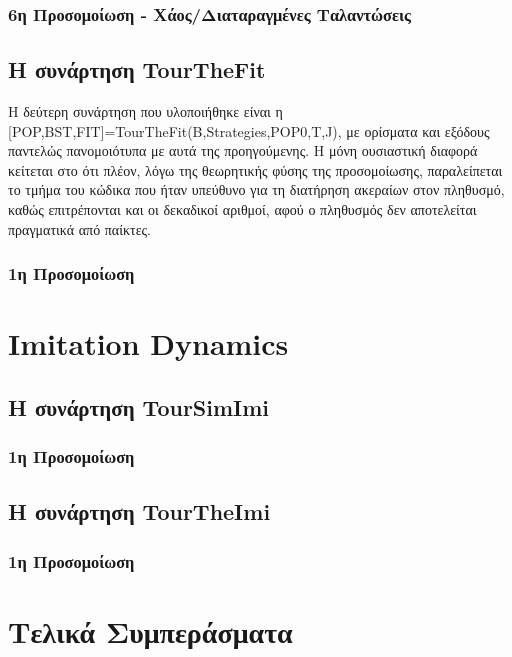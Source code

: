 \documentclass[12pt]{article}
\begin{document}
\subsubsection{6η Προσομοίωση - Χάος/Διαταραγμένες Ταλαντώσεις}

\subsection{Η συνάρτηση TourTheFit}
Η δεύτερη συνάρτηση που υλοποιήθηκε είναι η [POP,BST,FIT]=TourTheFit(B,Strategies,POP0,T,J), με ορίσματα και εξόδους παντελώς πανομοιότυπα με αυτά της προηγούμενης. Η μόνη ουσιαστική διαφορά κείτεται στο ότι πλέον, λόγω της θεωρητικής φύσης της προσομοίωσης, παραλείπεται το τμήμα του κώδικα που ήταν υπεύθυνο για τη διατήρηση ακεραίων στον πληθυσμό, καθώς επιτρέπονται και οι δεκαδικοί αριθμοί, αφού ο πληθυσμός δεν αποτελείται πραγματικά από παίκτες.
\subsubsection{1η Προσομοίωση}

\section{Imitation Dynamics}

\subsection{Η συνάρτηση TourSimImi}

\subsubsection{1η Προσομοίωση}

\subsection{Η συνάρτηση TourTheImi}

\subsubsection{1η Προσομοίωση}

\section{Τελικά Συμπεράσματα}

\newpage
\listoffigures{}
\end{document}
